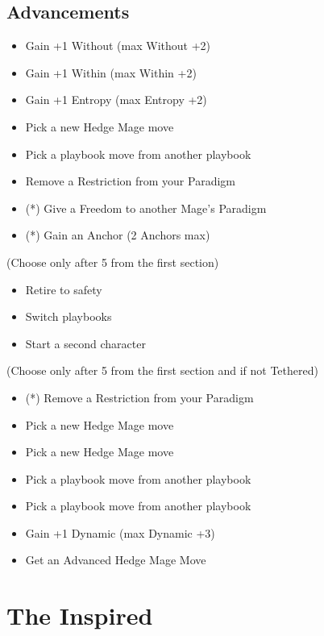 \documentclass[
  oneside,
  statementpaper,
  9pt]{memoir}
\begin{document}
\hypertarget{advancements-1}{%
\subsection{Advancements}\label{advancements-1}}

\begin{itemize}
\tightlist
\item
  Gain +1 Without (max Without +2)
\item
  Gain +1 Within (max Within +2)
\item
  Gain +1 Entropy (max Entropy +2)
\item
  Pick a new Hedge Mage move
\item
  Pick a playbook move from another playbook
\item
  Remove a Restriction from your Paradigm
\item
  (*) Give a Freedom to another Mage's Paradigm
\item
  (*) Gain an Anchor (2 Anchors max)
\end{itemize}

(Choose only after 5 from the first section)

\begin{itemize}
\tightlist
\item
  Retire to safety
\item
  Switch playbooks
\item
  Start a second character
\end{itemize}

(Choose only after 5 from the first section and if not Tethered)

\begin{itemize}
\tightlist
\item
  (*) Remove a Restriction from your Paradigm
\item
  Pick a new Hedge Mage move
\item
  Pick a new Hedge Mage move
\item
  Pick a playbook move from another playbook
\item
  Pick a playbook move from another playbook
\item
  Gain +1 Dynamic (max Dynamic +3)
\item
  Get an Advanced Hedge Mage Move
\end{itemize}

\newpage

\hypertarget{the-inspired}{%
\section{The Inspired}\label{the-inspired}}
\end{document}
